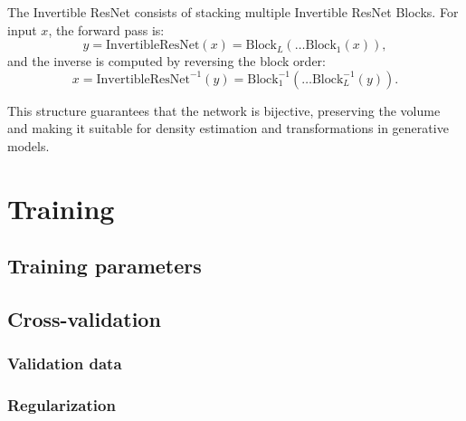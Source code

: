 \documentclass{article}
\theoremstyle{definition} \newtheorem{definition}{Definition}  \newtheorem{example}{Example}
\theoremstyle{remark} \newtheorem{remark}{Remark}
\newcounter{ct}
\begin{document}
The Invertible ResNet consists of stacking multiple Invertible ResNet Blocks. For input \( x \), the forward pass is:
\[
y = \text{InvertibleResNet}(x) = \text{Block}_L(\dots \text{Block}_1(x)),
\]
and the inverse is computed by reversing the block order:
\[
x = \text{InvertibleResNet}^{-1}(y) = \text{Block}_1^{-1}(\dots \text{Block}_L^{-1}(y)).
\]

This structure guarantees that the network is bijective, preserving the volume and making it suitable for density estimation and transformations in generative models.



%
%
%
%
%
%
%
%



\newpage
\section{Training}

\subsection{Training parameters}



\subsection{Cross-validation}

\subsubsection{Validation data}

\subsubsection{Regularization}
\end{document}
